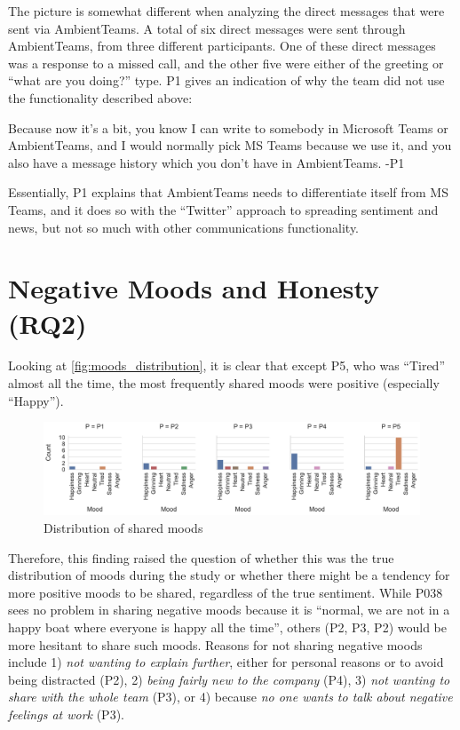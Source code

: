The picture is somewhat different when analyzing the direct messages that were sent via AmbientTeams. A total of six direct messages were sent through AmbientTeams, from three different participants. One of these direct messages was a response to a missed call, and the other five were either of the greeting or \enquote{what are you doing?} type. P1 gives an indication of why the team did not use the functionality described above:

\begin{displayquote}
    Because now it's a bit, you know I can write to somebody in Microsoft Teams or AmbientTeams, and I would normally pick MS Teams because we use it, and you also have a message history which you don't have in AmbientTeams. -P1
\end{displayquote}

Essentially, P1 explains that AmbientTeams needs to differentiate itself from MS Teams, and it does so with the \enquote{Twitter} approach to spreading sentiment and news, but not so much with other communications functionality.

\section{Negative Moods and Honesty (RQ2)}
\label{section:negative_moods_and_honesty}

Looking at \autoref{fig:moods_distribution}, it is clear that except P5, who was \enquote{Tired} almost all the time, the most frequently shared moods were positive (especially \enquote{Happy}).

\begin{figure}[h]
    \centering
    \includegraphics[width=\linewidth]{plots/moods_distribution.pdf}
    \caption{Distribution of shared moods }
    \label{fig:moods_distribution}
\end{figure}

Therefore, this finding raised the question of whether this was the true distribution of moods during the study or whether there might be a tendency for more positive moods to be shared, regardless of the true sentiment. While P038 sees no problem in sharing negative moods because it is \enquote{normal, we are not in a happy boat where everyone is happy all the time}, others (P2, P3, P2) would be more hesitant to share such moods. Reasons for not sharing negative moods include 1) \textit{not wanting to explain further}, either for personal reasons or to avoid being distracted (P2), 2) \textit{being fairly new to the company} (P4), 3) \textit{not wanting to share with the whole team} (P3), or 4) because \textit{no one wants to talk about negative feelings at work} (P3).

